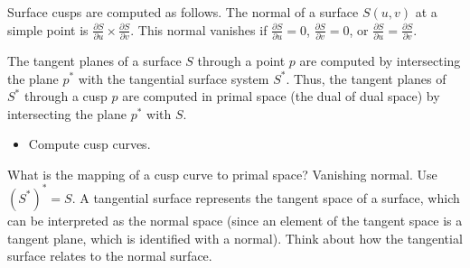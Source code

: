 \documentclass[12pt]{article}
\begin{document}
Surface cusps are computed as follows.
The normal of a surface $S(u,v)$ at a simple point is 
$\frac{\partial S}{\partial u} \times \frac{\partial S}{\partial v}$.
This normal vanishes if $\frac{\partial S}{\partial u} = 0$,
$\frac{\partial S}{\partial v} = 0$, or 
$\frac{\partial S}{\partial u} = \frac{\partial S}{\partial v}$.

The tangent planes of a surface $S$ through a point $p$ are computed 
by intersecting the plane $p^*$ with the tangential surface system $S^*$.
Thus, the tangent planes of $S^*$ through a cusp $p$ are computed 
in primal space (the dual of dual space) by intersecting the plane $p^*$ 
with $S$.

\begin{itemize}
\item	Compute cusp curves.
\end{itemize}

What is the mapping of a cusp curve to primal space?
Vanishing normal.
Use $(S^*)^* = S$.
A tangential surface represents the tangent space of a surface,
which can be interpreted as the normal space (since an element
of the tangent space is a tangent plane, which is identified with
a normal).
Think about how the tangential surface relates to the normal surface.
\end{document}
